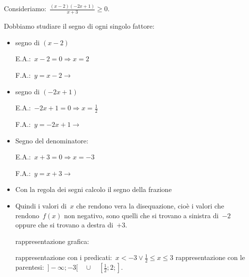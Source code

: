  \begin{esempio}
Consideriamo:~$\frac{(x-2)(-2x+1)}{x+3} \ge 0$.

Dobbiamo studiare il segno di ogni singolo fattore:
\begin{itemize} [noitemsep]
 \item segno di $(x-2)$\\
 \begin{minipage}{.45\textwidth}
  E.A.:~$x-2=0 \Rightarrow x=2$
 \end{minipage}
 \begin{minipage}{.25\textwidth}
  F.A.:~$y=x-2 \rightarrow $
 \end{minipage}
 \begin{minipage}{.3\textwidth}
  
 \end{minipage}
 \item segno di $(-2x+1)$\\
 \begin{minipage}{.45\textwidth}
  E.A.:~$-2x+1=0 \Rightarrow x=\frac{1}{2}$
 \end{minipage}
 \begin{minipage}{.25\textwidth}
  F.A.:~$y=-2x+1 \rightarrow $
 \end{minipage}
 \begin{minipage}{.3\textwidth}
  
 \end{minipage}
 \item Segno del denominatore:\\
 \begin{minipage}{.45\textwidth}
  E.A.:~$x + 3=0 \Rightarrow x=-3$
 \end{minipage}
 \begin{minipage}{.25\textwidth}
  F.A.:~$y=x +3 \rightarrow $
 \end{minipage}
 \begin{minipage}{.3\textwidth}
  
 \end{minipage}
 \item Con la regola dei segni calcolo il segno della frazione
  
 \item Quindi i valori di~$x$ che rendono vera la disequazione, cioè i valori
  che rendono~$f(x)$ non negativo, sono quelli
  che si trovano a sinistra di~$-2$ oppure che si trovano a destra di~$+3$.
 \subitem
  \begin{minipage}{.35\textwidth}
   rappresentazione grafica:
  \end{minipage}
  \begin{minipage}{.30\textwidth}
  \end{minipage}
 \subitem rappresentazione con i
   predicati:~$x < -3 \lor \frac{1}{2} \le x \le 3$
 \subitem rappresentazione con le
  parentesi:~$]-\infty; -3[ \quad \cup \quad [\frac{1}{2}; 2;]$.
\end{itemize}
 \end{esempio}

